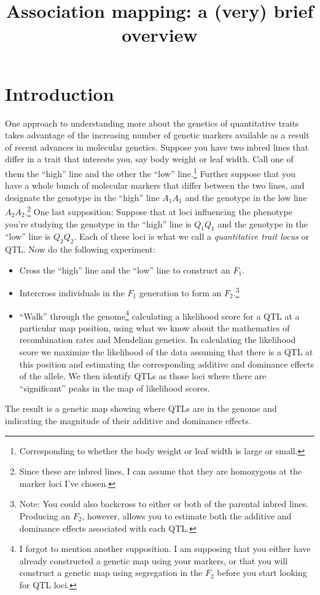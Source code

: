 \documentclass[12pt]{article}
\title{Association mapping: a (very) brief overview}
\begin{document}
\maketitle

\thispagestyle{first}

\section*{Introduction}

One approach to understanding more about the genetics of quantitative
traits takes advantage of the increasing number of genetic markers
available as a result of recent advances in molecular
genetics. Suppose you have two inbred lines that differ in a trait
that interests you, say body weight or leaf width. Call one of them
the ``high'' line and the other the ``low''
line.\footnote{Corresponding to whether the body weight or leaf width
  is large or small.} Further suppose that you have a whole bunch of
molecular markers that differ between the two lines, and designate the
genotype in the ``high'' line $A_1A_1$ and the genotype in the low
line $A_2A_2$.\footnote{Since these are inbred lines, I can assume
  that they are homozygous at the marker loci I've chosen.} One last
supposition: Suppose that at loci influencing the phenotype you're
studying the genotype in the ``high'' line is $Q_1Q_1$ and the
genotype in the ``low'' line is $Q_2Q_2$. Each of these loci is what
we call a {\it quantitative trait locus\/} or QTL. Now do the following experiment:

\begin{itemize}

\item Cross the ``high'' line and the ``low'' line to construct an
  $F_1$.

\item Intercross individuals in the $F_1$ generation to form an
  $F_2$.\footnote{Note: You could also backcross to either or both of
    the parental inbred lines. Producing an $F_2$, however, allows you
    to estimate both the additive and dominance effects associated
    with each QTL.}

\item ``Walk'' through the genome\footnote{I forgot to mention another
    supposition. I am supposing that you either have already
    constructed a genetic map using your markers, or that you will
    construct a genetic map using segregation in the $F_2$ before you
    start looking for QTL loci.} calculating a likelihood score for a
  QTL at a particular map position, using what we know about the
  mathematics of recombination rates and Mendelian genetics. In
  calculating the likelihood score we maximize the likelihood of the
  data assuming that there is a QTL at this position and estimating
  the corresponding additive and dominance effects of the allele. We
  then identify QTLs as those loci where there are ``significant''
  peaks in the map of likelihood scores.

\end{itemize}
The result is a genetic map showing where QTLs are in the genome and
indicating the magnitude of their additive and dominance effects.
\end{document}
